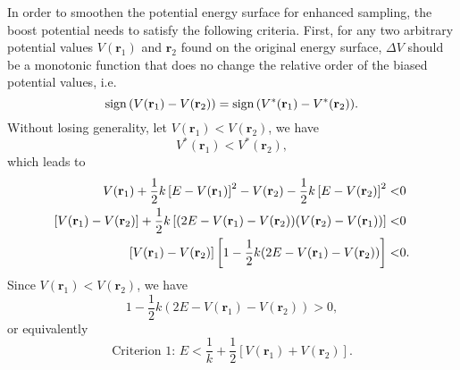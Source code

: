 In order to smoothen the potential energy surface for enhanced sampling, the boost potential needs to satisfy the following criteria. First, for any two arbitrary potential values $V(\mathbf{r}_1)$ and $\mathbf{r}_2$ found on the original energy surface, $\Delta V$ should be a monotonic function that does no change the relative order of the biased potential values, i.e. 
\begin{equation}
	\operatorname{sign}{(V(\mathbf{r}_1)-V(\mathbf{r}_2))}=\operatorname{sign}{(V^\ast(\mathbf{r}_1)-V^\ast(\mathbf{r}_2))}.
\end{equation}
Without losing generality, let $V(\mathbf{r}_1)<V(\mathbf{r}_2)$, we have
\begin{equation}
	V^\ast(\mathbf{r}_1)<V^\ast(\mathbf{r}_2),
\end{equation}
which leads to
\begin{align}
    V(\mathbf{r}_1)+\frac{1}{2}k\left[E-V(\mathbf{r}_1)\right]^2-V(\mathbf{r}_2)-\frac{1}{2}k\left[E-V(\mathbf{r}_2)\right]^2<&0\notag\\
    \left[V(\mathbf{r}_1)-V(\mathbf{r}_2)\right]+\frac{1}{2}k\left[(2E-V(\mathbf{r}_1)-V(\mathbf{r}_2))(V(\mathbf{r}_2)-V(\mathbf{r}_1))\right]<&0\notag\\
    \left[V(\mathbf{r}_1)-V(\mathbf{r}_2)\right]\left[1-\frac{1}{2}k(2E-V(\mathbf{r}_1)-V(\mathbf{r}_2))\right]<&0.
\end{align}
Since $V(\mathbf{r}_1)<V(\mathbf{r}_2)$, we have
\begin{equation}
	1-\frac{1}{2}k(2E-V(\mathbf{r}_1)-V(\mathbf{r}_2))>0,
\end{equation}
or equivalently
\begin{equation}
	\text{Criterion 1: } E<\frac{1}{k}+\frac{1}{2}\left[V(\mathbf{r}_1)+V(\mathbf{r}_2)\right].
\end{equation}

